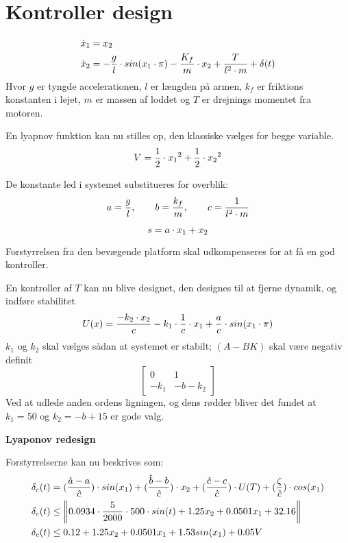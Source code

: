 \chapter{Kontroller design}
\begin{equation}
	\begin{split}
	\dot{x}_{1}&=x_{2} \\
	\dot{x}_{2}&=-\frac{g}{l} \cdot sin(x_1 \cdot \pi) - \frac{K_f}{m} \cdot x_2 + \frac{T}{l^2 \cdot m} + \delta (t)
	\end{split}
\end{equation}
Hvor $g$ er tyngde accelerationen, $l$ er længden på armen, $k_f$ er friktions konstanten i lejet, $m$ er massen af loddet og $T$ er drejnings momentet fra motoren.

En lyapnov funktion kan nu stilles op, den klassiske vælges for begge variable.
\begin{equation}
	V = \frac{1}{2} \cdot {x_{1}}^{2} + \frac{1}{2} \cdot {x_{2}}^{2}
\end{equation}

De konstante led i systemet substitueres for overblik:
\begin{equation}
	a = \frac{g}{l}, \qquad b = \frac{k_f}{m}, \qquad c=\frac{1}{l^2 \cdot m}
\end{equation}

\begin{equation}
	s = a \cdot x_1 + x_2
\end{equation}

Forstyrrelsen fra den bevægende platform skal udkompenseres for at få en god kontroller.


En kontroller af $T$ kan nu blive designet, den designes til at fjerne dynamik, og indføre stabilitet
\begin{equation}
	U(x) = \frac{-k_2 \cdot x_2}{c} - k_1 \cdot \frac{1}{c} \cdot x_1 + \frac{a}{c} \cdot sin(x_1 \cdot \pi)
\end{equation}
$k_1$ og $k_2$ skal vælges sådan at systemet er stabilt; $(A-BK)$ skal være negativ definit
\begin{equation}
	\begin{bmatrix}
	0 & 1 \\
	-k_1 & -b - k_2
	\end{bmatrix}
\end{equation}
Ved at udlede anden ordens ligningen, og dens rødder bliver det fundet at $k_1 = 50$ og $k_2 = -b +15$ er gode valg.

\textbf{Lyaponov redesign}

Forstyrrelserne kan nu beskrives som:
\begin{equation}
	\begin{split}
	\delta_c (t) &= (\frac{\hat{a}-a}{\hat{c}})\cdot sin(x_1) + (\frac{\hat{b}-b}{\hat{c}}) \cdot x_2 + (\frac{\hat{c}-c}{\hat{c}}) \cdot U(T) + (\frac{\zeta}{\hat{c}}) \cdot cos(x_1) \\
	\delta_c (t) &\leq \left \Vert 0.0934 \cdot \frac{5}{2000} \cdot 500 \cdot sin(t) + 1.25 x_2 + 0.0501 x_1 + 32.16	\right\Vert \\
	\delta_c (t) &\leq 0.12 + 1.25 x_2 + 0.0501 x_1 + 1.53sin(x_1) + 0.05 V \\
	\end{split}
\end{equation}

